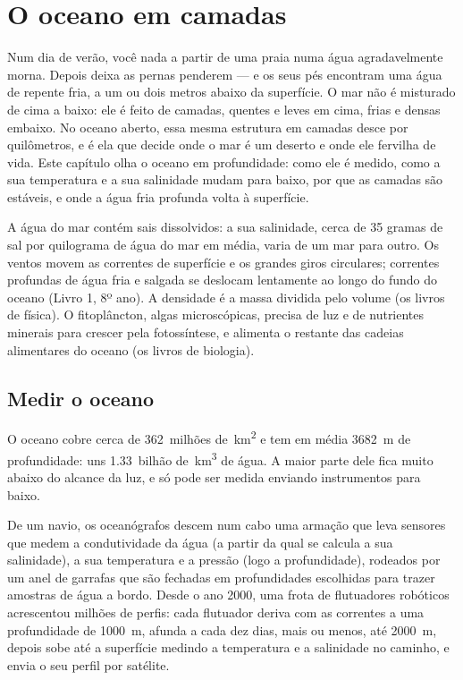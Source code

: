 \chapter{O oceano em camadas}\label{ch:g10:layered-ocean}

Num dia de verão, você nada a partir de uma praia numa água agradavelmente
morna. Depois deixa as pernas penderem --- e os seus pés encontram uma água
de repente fria, a um ou dois metros abaixo da superfície. O mar não é
misturado de cima a baixo: ele é feito de camadas, quentes e leves em cima,
frias e densas embaixo. No oceano aberto, essa mesma estrutura em camadas
desce por quilômetros, e é ela que decide onde o mar é um deserto e onde ele
fervilha de vida. Este capítulo olha o oceano em profundidade: como ele é
medido, como a sua temperatura e a sua salinidade mudam para baixo, por que
as camadas são estáveis, e onde a água fria profunda volta à superfície.

\begin{recall}
A água do mar contém sais dissolvidos: a sua salinidade, cerca de 35 gramas
de sal por quilograma de água do mar em média, varia de um mar para outro.
Os ventos movem as correntes de superfície e os grandes giros circulares;
correntes profundas de água fria e salgada se deslocam lentamente ao longo
do fundo do oceano (Livro 1, 8º ano). A densidade é a massa dividida pelo
volume (os livros de física). O fitoplâncton, algas microscópicas, precisa
de luz e de nutrientes minerais para crescer pela fotossíntese, e alimenta
o restante das cadeias alimentares do oceano (os livros de biologia).
\end{recall}

\section{Medir o oceano}

O oceano cobre cerca de \num{362}~milhões de~\unit{km^2} e tem em média
\qty{3682}{m} de profundidade: uns \num{1.33}~bilhão de~\unit{km^3} de água.
A maior parte dele fica muito abaixo do alcance da luz, e só pode ser medida
enviando instrumentos para baixo.

De um navio, os oceanógrafos descem num cabo uma armação que leva sensores
que medem a condutividade da água (a partir da qual se calcula a sua
salinidade), a sua temperatura e a pressão (logo a profundidade), rodeados
por um anel de garrafas que são fechadas em profundidades escolhidas para
trazer amostras de água a bordo. Desde o ano 2000, uma frota de flutuadores
robóticos acrescentou milhões de perfis: cada flutuador deriva com as
correntes a uma profundidade de \qty{1000}{m}, afunda a cada dez dias, mais
ou menos, até \qty{2000}{m}, depois sobe até a superfície medindo a
temperatura e a salinidade no caminho, e envia o seu perfil por satélite.

